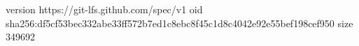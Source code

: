 version https://git-lfs.github.com/spec/v1
oid sha256:df5cf53bec332abe33ff572b7ed1c8ebc8f45c1d8c4042e92e55bef198cef950
size 349692
